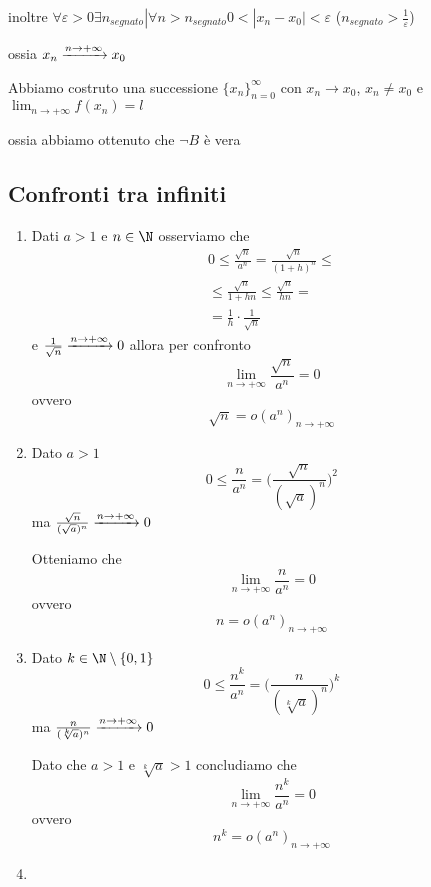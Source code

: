 {\begin{itemize}
        inoltre $ \forall \varepsilon >0 \exists n_{segnato} | \forall n>n_{segnato} 0<|x_{n}-x_{0}|<\varepsilon $ ($n_{segnato}>\frac{1}{\varepsilon}$)

        ossia $ x_{n} \xrightarrow{n\to + \infty} x_{0}  \displaystyle  $

        Abbiamo costruto una successione $ \{x_{n} \}_{n=0}^\infty $ con $ x_{n}\to x_0  $, $ x_{n} \neq x_0 $ e $ \lim_{n\to + \infty} f(x_{n} ) =l $ 

        ossia abbiamo ottenuto che $ \neg B $ è vera \qedhere
    \end{itemize}
}

\subsection{Confronti tra infiniti}
\begin{enumerate}
    \item Dati $ a>1 $ e $ n \in \N $ osserviamo che 
    \begin{multline*}
        0\le \frac{\sqrt{n}}{a^n}=\frac{\sqrt{n}}{(1+h)^n}\le\\
        \le \frac{\sqrt{n}}{1+hn}\le \frac{\sqrt{n}}{hn}=\\
        =\frac{1}{h}\cdot\frac{1}{\sqrt{n}}
    \end{multline*}
    e $ \frac{1}{\sqrt{n}} \xrightarrow{n\to + \infty} 0 \displaystyle $ allora per confronto \[
        \lim_{n\to +\infty} \frac{\sqrt{n}}{a^n} =0
    \]
    ovvero \[
        \sqrt{n}=o(a^n)_{n\to +\infty}
    \]
    \item Dato $ a>1 $
    \[
        0\le \frac{n}{a^n}=\bigg(\frac{\sqrt{n}}{(\sqrt{a})^n}\bigg)^2
    \]
    ma $ \frac{\sqrt{n}}{(\sqrt{a})^n} \xrightarrow{n\to + \infty} 0 \displaystyle $

    Otteniamo che \[
        \lim_{n\to + \infty} \frac{n}{a^n} =0
    \]
    ovvero \[
        n=o(a^n)_{n\to + \infty}
    \]
    \item Dato $ k \in \N\setminus \{0,1\} $
    \[
        0\le \frac{n^k}{a^n}=\bigg(\frac{n}{(\sqrt[k]{a})^n}\bigg)^k
    \]
    ma $ \frac{n}{(\sqrt[k]{a})^n} \xrightarrow{n\to + \infty} 0 \displaystyle $

    Dato che $ a>1 $ e $ \sqrt[k]{a}>1 $ concludiamo che \[
        \lim_{n\to + \infty} \frac{n^k}{a^n} = 0 
    \]
    ovvero \[
        n^k = o(a^n)_{n\to + \infty}
    \]
    \item %
\end{enumerate}